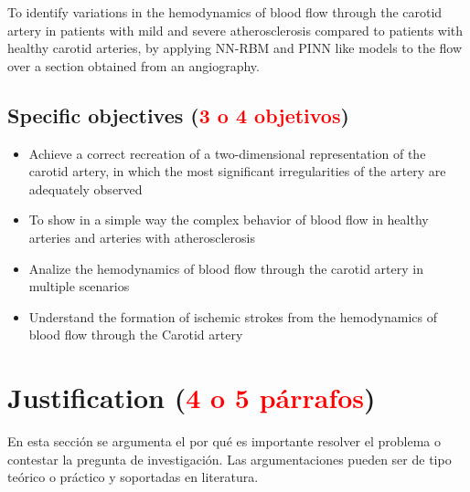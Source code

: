 \documentclass[12pt,letterpaper]{article}
\begin{document}
To identify variations in the hemodynamics of blood flow through the carotid artery in patients with
mild and severe atherosclerosis compared to patients with healthy carotid arteries, by applying NN-RBM and PINN like models to the flow over a section obtained from an angiography.


\subsection{Specific objectives (\textcolor{red}{3 o 4 objetivos})}

\begin{itemize}
  \item Achieve a correct recreation of a two-dimensional representation of the carotid artery, in which the most significant irregularities of the artery are adequately observed
  \item To show in a simple way the complex behavior of blood flow in healthy arteries and arteries with atherosclerosis
  \item Analize the hemodynamics of blood flow through the carotid artery in multiple scenarios
  \item Understand the formation of ischemic strokes from the hemodynamics of blood flow through the Carotid artery

\end{itemize}


\section{Justification (\textcolor{red}{4 o 5 párrafos})}


En esta sección se argumenta el por qué es importante resolver el problema o
contestar la pregunta de investigación. Las argumentaciones pueden ser de tipo
teórico o práctico y soportadas en literatura.
\end{document}
